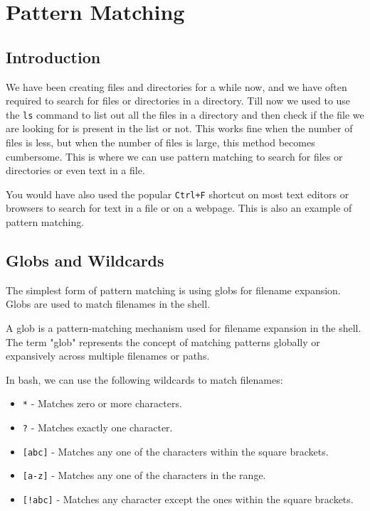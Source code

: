 \chapter{Pattern Matching}

\section{Introduction}

We have been creating files and directories for a while now,
and we have often required to search for files or directories
in a directory. Till now we used to use the \lstinline|ls| command
to list out all the files in a directory and then check if the
file we are looking for is present in the list or not. This
works fine when the number of files is less, but when the number
of files is large, this method becomes cumbersome. This is where
we can use pattern matching to search for files or directories
or even text in a file.

You would have also used the popular \lstinline|Ctrl+F| shortcut
on most text editors or browsers to search for text in a file
or on a webpage. This is also an example of pattern matching.

\section{Globs and Wildcards}

The simplest form of pattern matching is using globs for filename
expansion. Globs are used to match filenames in the shell.

\begin{definition}[Glob]
A glob is a pattern-matching mechanism used for filename expansion in the shell.
The term "glob" represents the concept of matching patterns globally or
expansively across multiple filenames or paths.
\end{definition}

In bash, we can use the following wildcards to match filenames:

\begin{itemize}
    \item \lstinline|*| - Matches zero or more characters.
    \item \lstinline|?| - Matches exactly one character.
    \item \lstinline|[abc]| - Matches any one of the characters within the square brackets.
    \item \lstinline|[a-z]| - Matches any one of the characters in the range.
    \item \lstinline|[!abc]| - Matches any character except the ones within the square brackets.
\end{itemize}

